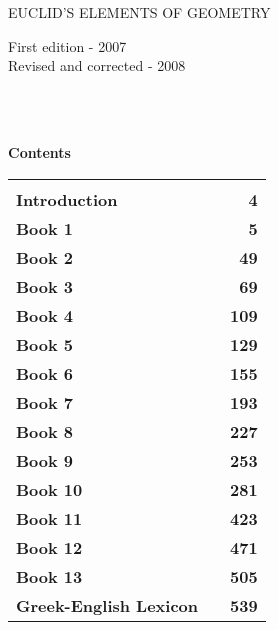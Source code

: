 \thispagestyle{empty}
\begin{center}
{\Huge\sf EUCLID'S ELEMENTS OF GEOMETRY}\\
\mbox{}\spa\spa{}
\end{center}

\newpage
\thispagestyle{empty}
\begin{flushleft}
First edition - 2007\\
Revised and corrected - 2008\\
~\\
\end{flushleft}

\newpage~\\
\thispagestyle{empty}
\begin{center}
{\Large\bf Contents}
\end{center}
\begin{tabular}{lcr}
&&\\[0.5ex]
{\bf Introduction}&\mbox{\hspace{12cm}}&{\bf 4}\\[3.ex]
{\bf Book 1}  && {\bf    5}\\[3.ex]
{\bf Book 2}  && {\bf  49}\\[3.ex]
{\bf Book 3}  && {\bf  69}\\[3.ex]
{\bf Book 4}  && {\bf 109}\\[3.ex]
{\bf Book 5}  && {\bf 129}\\[3.ex]
{\bf Book 6}  && {\bf  155}\\[3.ex]
{\bf Book 7}  && {\bf  193}\\[3.ex]
{\bf Book 8}  && {\bf  227}\\[3.ex]
{\bf Book 9}  && {\bf 253}\\[3.ex]
{\bf Book 10} &&{\bf 281}\\[3.ex]
{\bf Book 11}  && {\bf  423}\\[3.ex]
{\bf Book 12}  && {\bf 471}\\[3.ex]
{\bf Book 13} &&{\bf 505}\\[3.ex]
{\bf Greek-English Lexicon}&&{\bf 539}
\end{tabular}
\newpage

